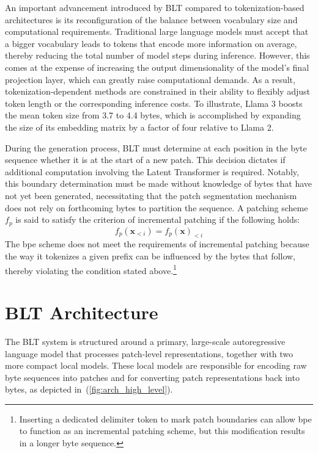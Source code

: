 An important advancement introduced by {\textsc BLT} compared to tokenization-based architectures is its reconfiguration of the balance between vocabulary size and computational requirements. Traditional large language models must accept that a bigger vocabulary leads to tokens that encode more information on average, thereby reducing the total number of model steps during inference. However, this comes at the expense of increasing the output dimensionality of the model’s final projection layer, which can greatly raise computational demands. As a result, tokenization-dependent methods are constrained in their ability to flexibly adjust token length or the corresponding inference costs. To illustrate, Llama 3 boosts the mean token size from 3.7 to 4.4 bytes, which is accomplished by expanding the size of its embedding matrix by a factor of four relative to Llama 2.

During the generation process, {\textsc BLT} must determine at each position in the byte sequence whether it is at the start of a new patch. This decision dictates if additional computation involving the Latent Transformer is required. Notably, this boundary determination must be made without knowledge of bytes that have not yet been generated, necessitating that the patch segmentation mechanism does not rely on forthcoming bytes to partition the sequence. A patching scheme $f_p$ is said to satisfy the criterion of incremental patching if the following holds:
$$f_p(\pmb{x}_{<i}) = f_p(\pmb{x})_{<i}$$
The bpe scheme does not meet the requirements of incremental patching because the way it tokenizes a given prefix can be influenced by the bytes that follow, thereby violating the condition stated above.\footnote{Inserting a dedicated delimiter token to mark patch boundaries can allow bpe to function as an incremental patching scheme, but this modification results in a longer byte sequence.}

\section{{\textsc BLT} Architecture}
\label{section:architecture}
The {\textsc BLT} system is structured around a primary, large-scale autoregressive language model that processes patch-level representations, together with two more compact local models. These local models are responsible for encoding raw byte sequences into patches and for converting patch representations back into bytes, as depicted in~(\autoref{fig:arch_high_level}).

